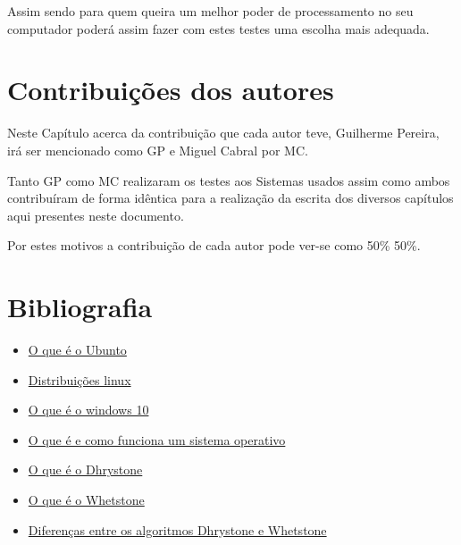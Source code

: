 \documentclass{report}
\begin{document}
Assim sendo para quem queira um melhor poder de processamento no seu computador poderá assim fazer com estes testes uma escolha mais adequada.
 


\chapter*{Contribuições dos autores}
Neste Capítulo acerca da contribuição que cada autor teve, Guilherme Pereira, irá ser mencionado como GP e Miguel Cabral por MC.

Tanto GP como MC realizaram os testes aos Sistemas usados assim como ambos contribuíram de forma idêntica para a realização da escrita dos diversos capítulos aqui presentes neste documento.

Por estes motivos a contribuição de cada autor pode ver-se como 50\% 50\%. 
\chapter*{Bibliografia}
\begin{itemize}
\item \href{https://help.ubuntu.com/lts/installation-guide/s390x/ch01s01.html}{O que é o Ubunto}
\item \href{https://www.howtogeek.com/132624/htg-explains-whats-a-linux-distro-and-how-are-they-different/}{Distribuições linux}
\item \href{https://searchenterprisedesktop.techtarget.com/definition/Windows-10}{O que é o windows 10}
\item \href{https://www.howtogeek.com/361572/what-is-an-operating-system/}{O que é e como funciona um sistema operativo}
\item \href{https://en.wikipedia.org/wiki/Dhrystone}{O que é o Dhrystone}
\item \href{https://en.wikipedia.org/wiki/Whetstone}{O que é o Whetstone}
\item \href{https://www.experts-exchange.com/questions/20080806/Dhrystone-Whetstone.html}{Diferenças entre os algoritmos Dhrystone e Whetstone}
\end{itemize}

\end{document}
